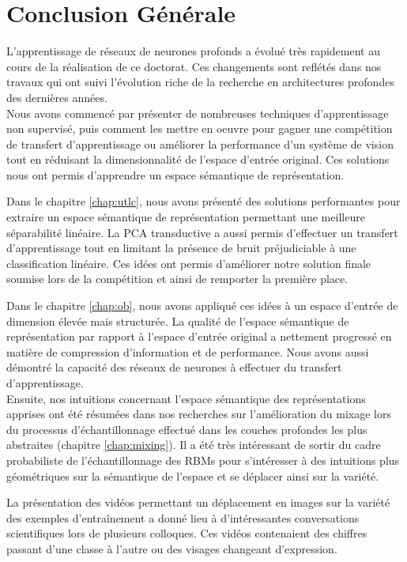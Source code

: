 
\chapter{Conclusion Générale}

L'apprentissage de réseaux de neurones profonds a évolué très rapidement au
cours de la réalisation de ce doctorat. Ces changements sont reflétés dans nos
travaux qui ont suivi l'évolution riche de la recherche en architectures
profondes des dernières années.
\\

Nous avons commencé par présenter de nombreuses techniques d'apprentissage non
supervisé, puis comment les mettre en oeuvre pour gagner une compétition de
transfert d'apprentissage ou améliorer la performance d'un système de vision
tout en réduisant la dimensionnalité de l'espace d'entrée original. Ces
solutions nous ont permis d'apprendre un espace sémantique de représentation.

Dans le chapitre \ref{chap:utlc}, nous avons présenté des solutions
performantes pour extraire un espace sémantique de représentation permettant
une meilleure séparabilité linéaire. La PCA transductive a aussi permis
d'effectuer un transfert d'apprentissage tout en limitant la présence de bruit
préjudiciable à une classification linéaire. Ces idées ont permis d'améliorer
notre solution finale soumise lors de la compétition et ainsi de remporter la
première place.

Dans le chapitre \ref{chap:ob}, nous avons appliqué ces idées à un espace
d'entrée de dimension élevée mais structurée. La qualité de l'espace sémantique
de représentation par rapport à l'espace d'entrée original a nettement
progressé en matière de compression d'information et de performance. Nous avons
aussi démontré la capacité des réseaux de neurones à effectuer du transfert
d'apprentissage. 
\\

Ensuite, nos intuitions concernant l'espace sémantique des représentations
apprises ont été résumées dans nos recherches sur l'amélioration du mixage lors
du processus d'échantillonnage effectué dans les couches profondes les plus
abstraites (chapitre \ref{chap:mixing}). Il a été très intéressant de sortir du
cadre probabiliste de l'échantillonnage des RBMs pour s'intéresser à des
intuitions plus géométriques sur la sémantique de l'espace et se déplacer ainsi
sur la variété. 

La présentation des vidéos permettant un déplacement en images sur la variété
des exemples d'entraînement a donné lieu à d'intéressantes conversations
scientifiques lors de plusieurs colloques. Ces vidéos contenaient des chiffres
passant d'une classe à l'autre ou des visages changeant d'expression.
\\

